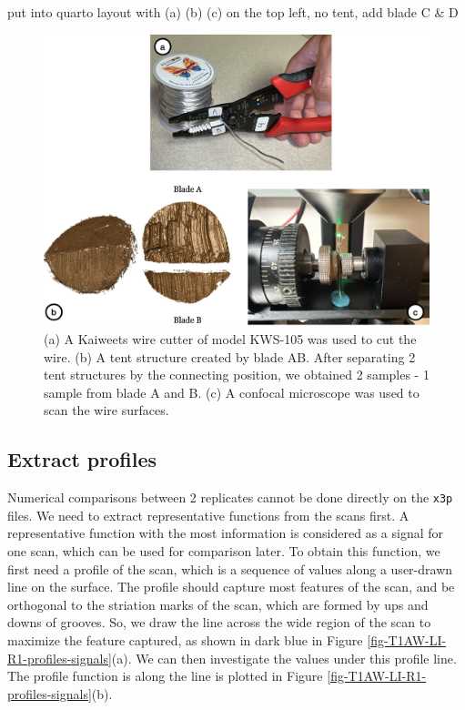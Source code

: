 \documentclass[fleqn,10pt]{wlscirep}
\newcommand{\tom}[1]{{\textcolor{RedOrange}{#1}}}
\begin{document}
\tom{put into quarto layout with (a) (b) (c) on the top left, no tent, add blade C \& D}
\begin{figure}[ht]
\centering
\includegraphics[width=0.9\linewidth]{cut-tent-scan.png}
\caption{(a) A Kaiweets wire cutter of model KWS-105 was used to cut the wire. (b) A tent structure created by blade AB. After separating 2 tent structures by the connecting position, we obtained 2 samples - 1 sample from blade A and B. (c) A confocal microscope was used to scan the wire surfaces.}
\label{fig-cut-tent-scan}
\end{figure}

\subsection{Extract profiles}\label{sec-extract-profiles}

Numerical comparisons between 2 replicates cannot be done directly on
the \texttt{x3p} files. We need to extract representative functions from
the scans first. A representative function with the most information is
considered as a signal for one scan, which can be used for comparison
later. To obtain this function, we first need a profile of the scan,
which is a sequence of values along a user-drawn line on the surface.
The profile should capture most features of the scan, and be orthogonal
to the striation marks of the scan, which are formed by ups and downs of
grooves. So, we draw the line across the wide region of the scan to
maximize the feature captured, as shown in dark blue in Figure
\ref{fig-T1AW-LI-R1-profiles-signals}(a). We can then investigate the
values under this profile line. The profile function is along the line
is plotted in Figure \ref{fig-T1AW-LI-R1-profiles-signals}(b).
\end{document}
